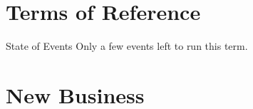 \documentclass[11pt,hacksoc]{meetingmins}
\begin{document}
\maketitle

\section{Terms of Reference}
\begin{items}

  \item {State of Events}
  \subitem Only a few events left to run this term.

\end{items}

\section{New Business}
\end{document}
